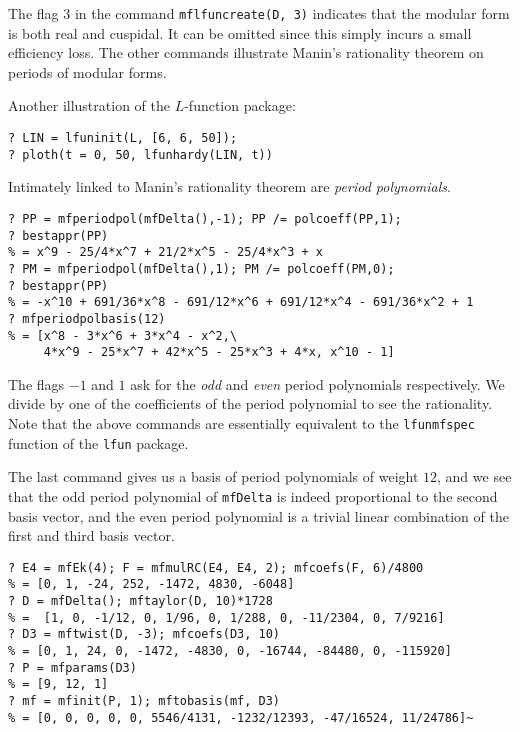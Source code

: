\documentclass[11pt]{article}
\def\kbd#1{{\tt #1}}
\begin{document}
The flag $3$ in the command \kbd{mflfuncreate(D, 3)} indicates that the
modular form is both real and cuspidal. It can be omitted since this simply
incurs a small efficiency loss. The other commands illustrate Manin's
rationality theorem on periods of modular forms.

Another illustration of the $L$-function package:

\begin{verbatim}
? LIN = lfuninit(L, [6, 6, 50]);
? ploth(t = 0, 50, lfunhardy(LIN, t))
\end{verbatim}


\medskip

Intimately linked to Manin's rationality theorem are \emph{period polynomials}.

\begin{verbatim}
? PP = mfperiodpol(mfDelta(),-1); PP /= polcoeff(PP,1);
? bestappr(PP)
% = x^9 - 25/4*x^7 + 21/2*x^5 - 25/4*x^3 + x
? PM = mfperiodpol(mfDelta(),1); PM /= polcoeff(PM,0);
? bestappr(PP)
% = -x^10 + 691/36*x^8 - 691/12*x^6 + 691/12*x^4 - 691/36*x^2 + 1
? mfperiodpolbasis(12)
% = [x^8 - 3*x^6 + 3*x^4 - x^2,\
     4*x^9 - 25*x^7 + 42*x^5 - 25*x^3 + 4*x, x^10 - 1]
\end{verbatim}

The flags $-1$ and $1$ ask for the \emph{odd} and \emph{even} period
polynomials respectively. We divide by one of the coefficients of the
period polynomial to see the rationality. Note that the above commands
are essentially equivalent to the \kbd{lfunmfspec} function of the
\kbd{lfun} package.

The last command gives us a basis of period polynomials of weight $12$, and
we see that the odd period polynomial of \kbd{mfDelta} is indeed proportional
to the second basis vector, and the even period polynomial is a trivial
linear combination of the first and third basis vector.

\medskip

\begin{verbatim}
? E4 = mfEk(4); F = mfmulRC(E4, E4, 2); mfcoefs(F, 6)/4800
% = [0, 1, -24, 252, -1472, 4830, -6048]
? D = mfDelta(); mftaylor(D, 10)*1728
% =  [1, 0, -1/12, 0, 1/96, 0, 1/288, 0, -11/2304, 0, 7/9216]
? D3 = mftwist(D, -3); mfcoefs(D3, 10)
% = [0, 1, 24, 0, -1472, -4830, 0, -16744, -84480, 0, -115920]
? P = mfparams(D3)
% = [9, 12, 1]
? mf = mfinit(P, 1); mftobasis(mf, D3)
% = [0, 0, 0, 0, 0, 5546/4131, -1232/12393, -47/16524, 11/24786]~
\end{verbatim}
\end{document}
